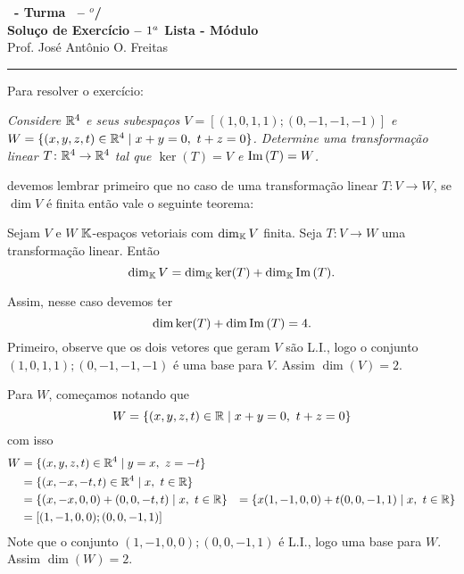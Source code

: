 \documentclass[12pt]{exam}
\begin{document}
    \begin{center}
        {\Large\bf \disciplina\ - Turma \turma\ -- \semestre$^{o}$/\ano} \\ \vspace{9pt} {\large\bf
            Solu\c{c}o de Exercício -- $1^a$ Lista - Módulo \numeromodulo}\\ \vspace{9pt} Prof. José Antônio O. Freitas
    \end{center}
    \hrule

    Para resolver o exercício:
    \begin{center}
        \begin{flushleft}
            \textit{Considere $\mathbb{R}^4$ e seus subespa\c{c}os $V = [(1,0,1,1);(0,-1,-1,-1)]$ e $W = \{(x,y,z,t) \in \mathbb{R}^4 \mid x + y = 0,\ t + z = 0\}$. Determine uma transforma\c{c}ão linear $T \colon \mathbb{R}^4 \to \mathbb{R}^4$ tal que $\ker(T) = V$ e ${\rm Im\,}(T) = W$.}
         \end{flushleft}
    \end{center}
    devemos lembrar primeiro que no caso de uma transforma\c{c}ão linear $T \colon V \to W$, se $\dim V$ é finita então vale o seguinte teorema:

    \begin{tcolorbox}[colback=green!30, colframe=green!80!blue, title=Teorema do Núcleo e da Imagem]
        Sejam $V$ e $W$ $\mathbb{K}$-espa\c{c}os vetoriais com $\dim_{\mathbb{K}}V$ finita. Seja $T \colon V \to W$ uma transforma\c{c}ão linear. Então
        \[
            \dim_{\mathbb{K}}V = \dim_{\mathbb{K}}\ker(T) + \dim_{\mathbb{K}}{\rm Im\,}(T).
        \]
    \end{tcolorbox}

    Assim, nesse caso devemos ter
    \[
        \dim\ker(T) + \dim{\rm Im\,}(T) = 4.
    \]
    Primeiro, observe que os dois vetores que geram $V$ são L.I., logo o conjunto ${(1, 0, 1, 1); (0,-1,-1,-1)}$ é uma base para $V$. Assim $\dim(V) = 2$.

    Para $W$, come\c{c}amos notando que
    \[
        W = \{(x, y, z, t) \in \mathbb{R} \mid x + y = 0,\ t + z = 0\}
    \]
    com isso
    \begin{align*}
        W &= \{(x, y, z, t) \in \mathbb{R}^4 \mid y = x,\ z = -t\} \\ &= \{(x, -x, -t, t) \in \mathbb{R}^4 \mid x,\ t \in \mathbb{R}\} \\ &= \{(x, -x, 0, 0) + (0, 0, -t, t) \mid x,\ t \in \mathbb{R}\} &= \{x(1, -1, 0, 0) + t(0, 0, -1, 1) \mid x,\ t \in \mathbb{R}\} \\ &= [(1, -1, 0, 0); (0, 0, -1, 1)]
    \end{align*}
    Note que o conjunto ${(1, -1, 0, 0); (0, 0, -1, 1)}$ é L.I., logo uma base para $W$. Assim $\dim(W) = 2$.
\end{document}
